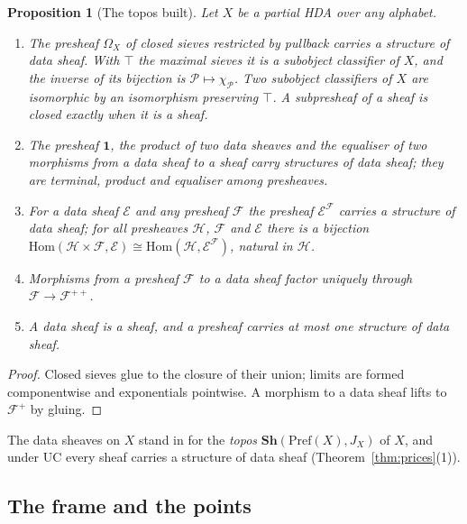 \documentclass{lmcs}
\newtheorem{proposition}[theorem]{Proposition}
\theoremstyle{definition}
\theoremstyle{remark}
\newcommand{\Sh}{\mathbf{Sh}}
\newcommand{\prin}[1]{\mathrm{#1}}
\newcommand{\UC}{\prin{UC}}
\newcommand{\Pref}{\mathrm{Pref}}
\newcommand{\JX}[1]{J_{#1}}
\begin{document}
\begin{proposition}[The topos built]\label{thm:setup-built}
Let $X$ be a partial HDA over any alphabet.
\begin{enumerate}
\item The presheaf $\Omega_X$ of closed sieves restricted by pullback carries a structure of data
  sheaf. With $\top$ the maximal sieves it is a subobject classifier of
  $X$, and the inverse of its bijection is $\mathscr{P}\mapsto\chi_{\mathscr{P}}$.
  Two subobject classifiers of $X$ are isomorphic by an isomorphism preserving $\top$. A subpresheaf of a sheaf is closed exactly when it is a sheaf.
\item The presheaf $\mathbf{1}$, the product of two data sheaves and the equaliser of two morphisms from a data sheaf
  to a sheaf carry structures of data sheaf;
  they are terminal, product and equaliser among
  presheaves.
\item For a data sheaf $\mathscr{E}$ and any presheaf $\mathscr{F}$ the presheaf $\mathscr{E}^{\mathscr{F}}$ carries
  a structure of data sheaf; for all presheaves $\mathscr{H}$, $\mathscr{F}$ and
  $\mathscr{E}$ there is a bijection
  $\mathrm{Hom}(\mathscr{H}\times \mathscr{F},\mathscr{E})\cong\mathrm{Hom}(\mathscr{H},\mathscr{E}^{\mathscr{F}})$,
  natural in $\mathscr{H}$.
\item Morphisms from a presheaf $\mathscr{F}$ to a data sheaf factor uniquely through $\mathscr{F}\to
  \mathscr{F}^{++}$.
\item A data sheaf is a sheaf, and a presheaf carries at most one structure of
  data sheaf.
\end{enumerate}
\end{proposition}

\begin{proof}
Closed sieves glue to the closure of their union; limits are formed componentwise and exponentials
pointwise.
A morphism to a data sheaf lifts to $\mathscr{F}^+$ by gluing.
\end{proof}

The data sheaves on $X$ stand in for the \emph{topos} $\Sh(\Pref(X),\JX{X})$ of $X$, and under $\UC$ every sheaf
carries a structure of data sheaf (Theorem~\ref{thm:prices}(1)).

\subsection{The frame and the points}\label{ssec:points}
\end{document}
